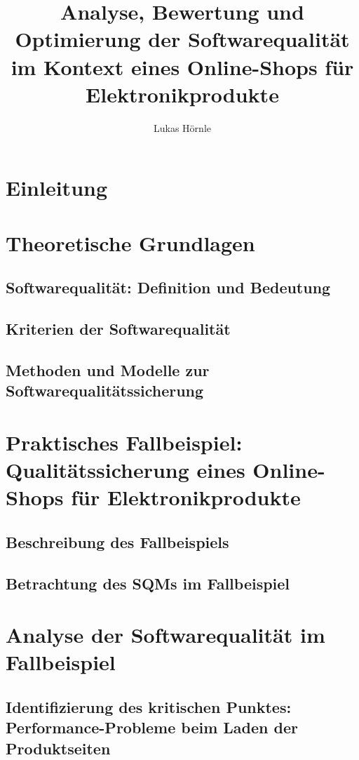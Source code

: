 \documentclass{article}
\begin{document}
\title{Analyse, Bewertung und Optimierung der Softwarequalität im Kontext eines Online-Shops für Elektronikprodukte}
\author{Lukas Hörnle}
\maketitle

\tableofcontents

\section{Einleitung}
\section{Theoretische Grundlagen}
\subsection{Softwarequalität: Definition und Bedeutung}
\subsection{Kriterien der Softwarequalität}
\subsection{Methoden und Modelle zur Softwarequalitätssicherung}

\section{Praktisches Fallbeispiel: Qualitätssicherung eines Online-Shops für Elektronikprodukte}
\subsection{Beschreibung des Fallbeispiels}
\subsection{Betrachtung des SQMs im Fallbeispiel}

\section{Analyse der Softwarequalität im Fallbeispiel}
\subsection{Identifizierung des kritischen Punktes: Performance-Probleme beim Laden der Produktseiten}
\end{document}

